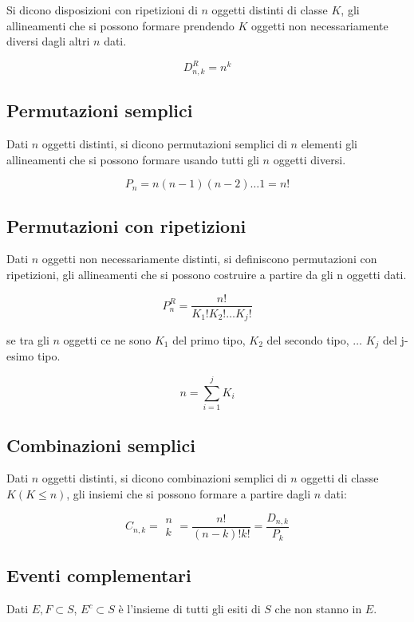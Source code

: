 \documentclass{article}
\begin{document}
Si dicono disposizioni con ripetizioni di $n$ oggetti distinti di classe $K$, gli allineamenti che si possono formare prendendo $K$ oggetti non necessariamente diversi dagli altri $n$ dati.

$$
D^R_{n,k} = n^k
$$

\subsection{Permutazioni semplici}

Dati $n$ oggetti distinti, si dicono permutazioni semplici di $n$ elementi gli allineamenti che si possono formare usando tutti gli $n$ oggetti diversi.

$$
P_n = n(n-1)(n-2)\dots1 = n!
$$

\subsection{Permutazioni con ripetizioni}

Dati $n$ oggetti non necessariamente distinti, si definiscono permutazioni con ripetizioni, gli allineamenti che si possono costruire a partire da gli n oggetti dati.

$$
P^R_n = \frac{n!}{K_1!K_2!\dots K_j!}
$$

\noindent
se tra gli $n$ oggetti ce ne sono $K_1$ del primo tipo, $K_2$ del secondo tipo, $\dots$ $K_j$ del j-esimo tipo.

$$
n = \sum^j_{i=1}K_i
$$

\subsection{Combinazioni semplici}

Dati $n$ oggetti distinti, si dicono combinazioni semplici di $n$ oggetti di classe $K (K \leq n)$, gli insiemi che si possono formare a partire dagli $n$ dati:

$$
C_{n,k} = \begin{matrix} n\\ k \end{matrix} = \frac{n!}{(n-k)!k!} = \frac{D_{n,k}}{P_k}
$$

\subsection{Eventi complementari}

Dati $E,F \subset S$, $E^c \subset S$ è l'insieme di tutti gli esiti di $S$ che non stanno in $E$.
\end{document}
